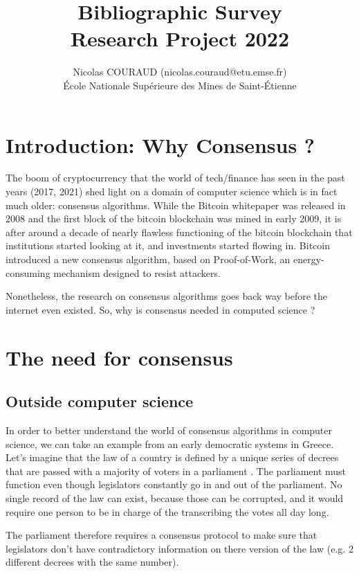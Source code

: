 \documentclass[11pt, twocolumn]{article}
\title{Bibliographic Survey\\\medskip Research Project 2022}
\author{Nicolas COURAUD (nicolas.couraud@etu.emse.fr)\\École Nationale Supérieure des Mines de Saint-Étienne}
\begin{document}
\maketitle
\onecolumn
\section*{Introduction: Why Consensus ?}

The boom of cryptocurrency that the world of tech/finance has seen in the past years (2017, 2021) shed light on a domain of computer science which is in fact much older: consensus algorithms. While the Bitcoin whitepaper was released in 2008 and the first block of the bitcoin blockchain was mined in early 2009, it is after around a decade of nearly flawless functioning of the bitcoin blockchain that institutions started looking at it, and investments started flowing in.
Bitcoin introduced a new consensus algorithm, based on Proof-of-Work, an energy-consuming mechanism designed to resist attackers.

Nonetheless, the research on consensus algorithms goes back way before the internet even existed.
So, why is consensus needed in computed science ?


\tableofcontents
\section{The need for consensus}

\subsection{Outside computer science}

In order to better understand the world of consensus algorithms in computer science, we can take an example from an early democratic systems in Greece. Let's imagine that the law of a country is defined by a unique series of decrees that are passed with a majority of voters in a parliament \cite{parliament} . The parliament must function even though legislators constantly go in and out of the parliament.
No single record of the law can exist, because those can be corrupted, and it would require one person to be in charge of the transcribing the votes all day long.

The parliament therefore requires a consensus protocol to make sure that legislators don't have contradictory information on there version of the law (e.g. 2 different decrees with the same number).
\end{document}
